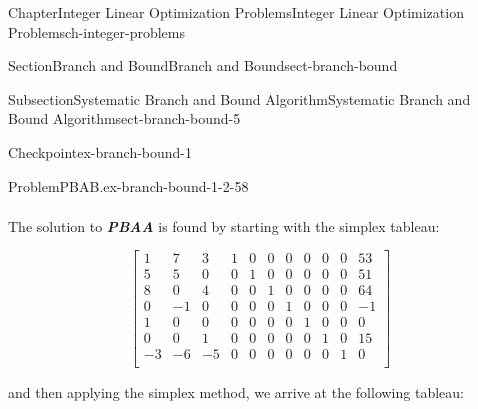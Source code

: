 \documentclass[oneside,10pt,]{book}
\newcommand{\alert}[1]{\textbf{\textit{#1}}}
\numberwithin{equation}{section}
\newcommand{\amp}{&}
\begin{document}
\begin{chapterptx}{Chapter}{Integer Linear Optimization Problems}{}{Integer Linear Optimization Problems}{}{}{ch-integer-problems}
\begin{sectionptx}{Section}{Branch and Bound}{}{Branch and Bound}{}{}{sect-branch-bound}
\begin{subsectionptx}{Subsection}{Systematic Branch and Bound Algorithm}{}{Systematic Branch and Bound Algorithm}{}{}{sect-branch-bound-5}
\begin{inlineexercise}{Checkpoint}{}{ex-branch-bound-1}
\begin{problem}{Problem}{PBAB.}{ex-branch-bound-1-2-58}
\begin{equation*}
\begin{aligned}
\end{aligned}
\end{equation*}
%
\end{problem}
The solution to \alert{PBAA} is found by starting with the simplex tableau:%
\par
%
\begin{equation*}
\left[\begin{array}{rrr|rrrrrrr|r} 1 \amp 7 \amp 3 \amp 1 \amp 0 \amp 0 \amp 0 \amp 0 \amp 0 \amp 0 \amp 53\\ 5 \amp 5 \amp 0 \amp 0 \amp 1 \amp 0 \amp 0 \amp 0 \amp 0 \amp 0 \amp 51\\ 8 \amp 0 \amp 4 \amp 0 \amp 0 \amp 1 \amp 0 \amp 0 \amp 0 \amp 0 \amp 64\\ 0 \amp -1 \amp 0 \amp 0 \amp 0 \amp 0 \amp 1 \amp 0 \amp 0 \amp 0 \amp -1\\ 1 \amp 0 \amp 0 \amp 0 \amp 0 \amp 0 \amp 0 \amp 1 \amp 0 \amp 0 \amp 0\\ 0 \amp 0 \amp 1 \amp 0 \amp 0 \amp 0 \amp 0 \amp 0 \amp 1 \amp 0 \amp 15\\ \hline -3 \amp -6 \amp -5 \amp 0 \amp 0 \amp 0 \amp 0 \amp 0 \amp 0 \amp 1 \amp 0\\ \end{array} \right]
\end{equation*}
%
\par
and then applying the simplex method, we arrive at the following tableau:%
\par
%
\begin{equation*}

\end{equation*}
\end{inlineexercise}
\end{subsectionptx}
\end{sectionptx}
\end{chapterptx}
\end{document}
